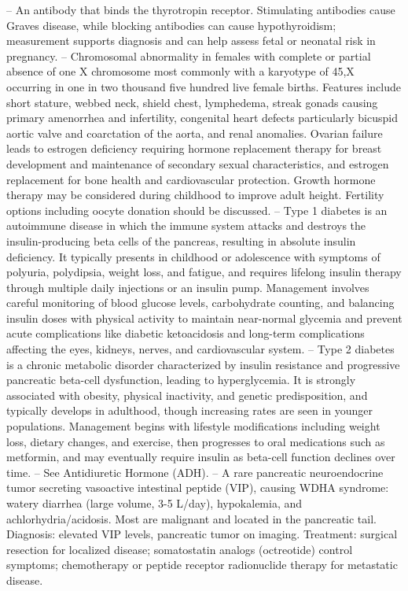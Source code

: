-- An antibody that binds the thyrotropin receptor. Stimulating antibodies cause Graves disease, while blocking antibodies can cause hypothyroidism; measurement supports diagnosis and can help assess fetal or neonatal risk in pregnancy.
-- Chromosomal abnormality in females with complete or partial absence of one X chromosome most commonly with a karyotype of 45,X occurring in one in two thousand five hundred live female births. Features include short stature, webbed neck, shield chest, lymphedema, streak gonads causing primary amenorrhea and infertility, congenital heart defects particularly bicuspid aortic valve and coarctation of the aorta, and renal anomalies. Ovarian failure leads to estrogen deficiency requiring hormone replacement therapy for breast development and maintenance of secondary sexual characteristics, and estrogen replacement for bone health and cardiovascular protection. Growth hormone therapy may be considered during childhood to improve adult height. Fertility options including oocyte donation should be discussed.
-- Type 1 diabetes is an autoimmune disease in which the immune system attacks and destroys the insulin-producing beta cells of the pancreas, resulting in absolute insulin deficiency. It typically presents in childhood or adolescence with symptoms of polyuria, polydipsia, weight loss, and fatigue, and requires lifelong insulin therapy through multiple daily injections or an insulin pump. Management involves careful monitoring of blood glucose levels, carbohydrate counting, and balancing insulin doses with physical activity to maintain near-normal glycemia and prevent acute complications like diabetic ketoacidosis and long-term complications affecting the eyes, kidneys, nerves, and cardiovascular system.
-- Type 2 diabetes is a chronic metabolic disorder characterized by insulin resistance and progressive pancreatic beta-cell dysfunction, leading to hyperglycemia. It is strongly associated with obesity, physical inactivity, and genetic predisposition, and typically develops in adulthood, though increasing rates are seen in younger populations. Management begins with lifestyle modifications including weight loss, dietary changes, and exercise, then progresses to oral medications such as metformin, and may eventually require insulin as beta-cell function declines over time.
-- See Antidiuretic Hormone (ADH).
-- A rare pancreatic neuroendocrine tumor secreting vasoactive intestinal peptide (VIP), causing WDHA syndrome: watery diarrhea (large volume, 3-5 L/day), hypokalemia, and achlorhydria/acidosis. Most are malignant and located in the pancreatic tail. Diagnosis: elevated VIP levels, pancreatic tumor on imaging. Treatment: surgical resection for localized disease; somatostatin analogs (octreotide) control symptoms; chemotherapy or peptide receptor radionuclide therapy for metastatic disease.
